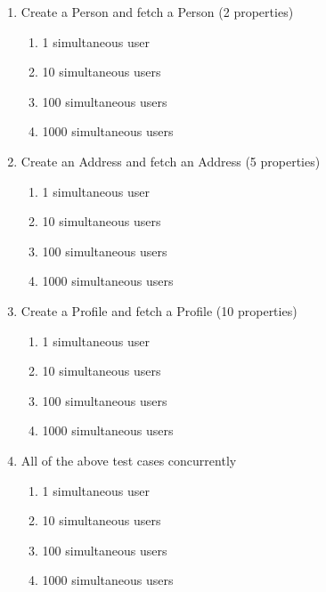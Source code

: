 \documentclass[a4paper,oneside]{bth}
\begin{document}
\begin{enumerate}[label=TC\arabic*]

\item Create a Person and fetch a Person (2 properties)
\begin{enumerate}

\item 1 simultaneous user
\item 10 simultaneous users
\item 100 simultaneous users
\item 1000 simultaneous users

\end{enumerate}

\item Create an Address and fetch an Address (5 properties)
\begin{enumerate}

\item 1 simultaneous user
\item 10 simultaneous users
\item 100 simultaneous users
\item 1000 simultaneous users

\end{enumerate}

\item Create a Profile and fetch a Profile (10 properties)
\begin{enumerate}

\item 1 simultaneous user
\item 10 simultaneous users
\item 100 simultaneous users
\item 1000 simultaneous users

\end{enumerate}

\item All of the above test cases concurrently
\begin{enumerate}

\item 1 simultaneous user
\item 10 simultaneous users
\item 100 simultaneous users
\item 1000 simultaneous users

\end{enumerate}

\end{enumerate}
\end{document}
